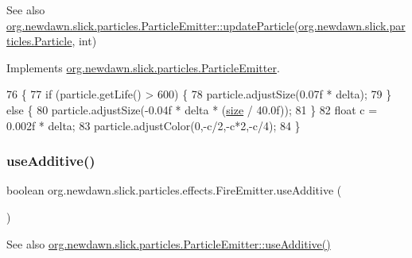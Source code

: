 \begin{DoxySeeAlso}{See also}
\mbox{\hyperlink{interfaceorg_1_1newdawn_1_1slick_1_1particles_1_1_particle_emitter_ac0792f19fdebd62a321bcdc487e0cba5}{org.\+newdawn.\+slick.\+particles.\+Particle\+Emitter\+::update\+Particle}}(\mbox{\hyperlink{classorg_1_1newdawn_1_1slick_1_1particles_1_1_particle}{org.\+newdawn.\+slick.\+particles.\+Particle}}, int) 
\end{DoxySeeAlso}


Implements \mbox{\hyperlink{interfaceorg_1_1newdawn_1_1slick_1_1particles_1_1_particle_emitter_ac0792f19fdebd62a321bcdc487e0cba5}{org.\+newdawn.\+slick.\+particles.\+Particle\+Emitter}}.


\begin{DoxyCode}
76                                                              \{
77         \textcolor{keywordflow}{if} (particle.getLife() > 600) \{
78             particle.adjustSize(0.07f * delta);
79         \} \textcolor{keywordflow}{else} \{
80             particle.adjustSize(-0.04f * delta * (\mbox{\hyperlink{classorg_1_1newdawn_1_1slick_1_1particles_1_1effects_1_1_fire_emitter_a56f377cd2920bfb430498077465db884}{size}} / 40.0f));
81         \}
82         \textcolor{keywordtype}{float} c = 0.002f * delta;
83         particle.adjustColor(0,-c/2,-c*2,-c/4);
84     \}
\end{DoxyCode}
\mbox{\label{classorg_1_1newdawn_1_1slick_1_1particles_1_1effects_1_1_fire_emitter_afbace8ff2bcdb80e3ec810ffcdeaf521}} 
\subsubsection{\texorpdfstring{use\+Additive()}{useAdditive()}}
{\footnotesize\ttfamily boolean org.\+newdawn.\+slick.\+particles.\+effects.\+Fire\+Emitter.\+use\+Additive (\begin{DoxyParamCaption}{ }\end{DoxyParamCaption})\hspace{0.3cm}{\ttfamily [inline]}}

\begin{DoxySeeAlso}{See also}
\mbox{\hyperlink{interfaceorg_1_1newdawn_1_1slick_1_1particles_1_1_particle_emitter_a36f6bfeef5567c7c5b42c866a738cdb7}{org.\+newdawn.\+slick.\+particles.\+Particle\+Emitter\+::use\+Additive()}} 
\end{DoxySeeAlso}



